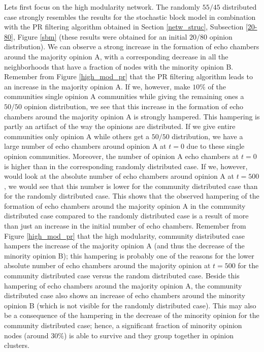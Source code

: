 \documentclass[11 pt , letterpaper , twoside , openright]{book}
\begin{document}
Lets first focus on the high modularity network. The randomly $55/45$ distributed case strongly resembles the results for the stochastic block model in combination with the PR filtering algorithm obtained in Section \ref{netw_struc}, Subsection \ref{20-80}, Figure \ref{sbm} (these results were obtained for an initial $20/80$ opinion distribution). We can observe a strong increase in the formation of echo chambers around the majority opinion A, with a corresponding decrease in all the neighborhoods that have a fraction of nodes with the minority opinion B. Remember from Figure \ref{high_mod_pr} that the PR filtering algorithm leads to an increase in the majority opinion A. If we, however, make $10 \%$ of the communities single opinion A communities while giving the remaining ones a $50/50$ opinion distribution, we see that this increase in the formation of echo chambers around the majority opinion A is strongly hampered. This hampering is partly an artifact of the way the opinions are distributed. If we give entire communities only opinion A while others get a $50/50$ distribution, we have a large number of echo chambers around opinion A at $t=0$ due to these single opinion communities. Moreover, the number of opinion A echo chambers at $t=0$ is higher than in the corresponding randomly distributed case. If we, however, would look at the absolute number of echo chambers around opinion A at $t=500$, we would see that this number is lower for the community distributed case than for the randomly distributed case. This shows that the observed hampering of the formation of echo chambers around the majority opinion A in the community distributed case compared to the randomly distributed case is a result of more than just an increase in the initial number of echo chambers. Remember from Figure \ref{high_mod_pr} that the high modularity, community distributed case hampers the increase of the majority opinion A (and thus the decrease of the minority opinion B); this hampering is probably one of the reasons for the lower absolute number of echo chambers around the majority opinion at $t=500$ for the community distributed case versus the random distributed case. Beside this hampering of echo chambers around the majority opinion A, the community distributed case also shows an increase of echo chambers around the minority opinion B (which is not visible for the randomly distributed case). This may also be a consequence of the hampering in the decrease of the minority opinion for the community distributed case; hence, a significant fraction of minority opinion nodes (around $30 \%$) is able to survive and they group together in opinion clusters.\\  %
\end{document}
